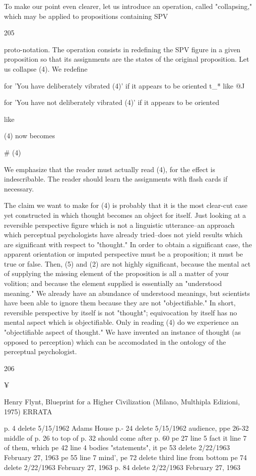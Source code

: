 \documentclass[10pt,twoside]{memoir}
\begin{document}
\begin{enumerate}
{\begin{enumerate}
\begin{sysrules}
\begin{sysrules}
\begin{sysrules}
\begin{sysrules}
{\begin{enumerate}
{{{{{{{{{{{To make our point even clearer, let us introduce an operation, called 
"collapsing," which may be applied to propositions containing SPV 


205 


proto-notation. The operation consists in redefining the SPV figure in a given 
proposition so that its assignments are the states of the original proposition. 
Let us collapse (4). We redefine 

for 'You have deliberately vibrated (4)' if it appears to be oriented 
t_* like @J 

for 'You have not deliberately vibrated (4)' if it appears to be oriented 

like 


(4) now becomes 


# (4) 


We emphasize that the reader must actually read (4), for the effect is 
indescribable. The reader should learn the assignments with flash cards if 
necessary. 

The claim we want to make for (4) is probably that it is the most 
clear-cut case yet constructed in which thought becomes an object for itself. 
Just looking at a reversible perspective figure which is not a linguistic 
utterance--an approach which perceptual psychologists have already 
tried--does not yield results which are significant with respect to "thought." 
In order to obtain a significant case, the apparent orientation or imputed 
perspective must be a proposition; it must be true or false. Then, (5) and (2) 
are not highly significant, because the mental act of supplying the missing 
element of the proposition is all a matter of your volition; and because the 
element supplied is essentially an "understood meaning." We already have an 
abundance of understood meanings, but scientists have been able to ignore 
them because they are not "objectifiable." In short, reversible perspective by 
itself is not "thought"; equivocation by itself has no mental aspect which is 
objectifiable. Only in reading (4) do we experience an "objectifiable aspect 
of thought." We have invented an instance of thought (as opposed to 
perception) which can be accomodated in the ontology of the perceptual 
psychologist. 


206 


¥ 


Henry Flynt, Blueprint for a Higher Civilization 
(Milano, Multhipla Edizioni, 1975) 
ERRATA 


p. 4 delete 5/15/1962 
Adams House 
p.- 24 delete 5/15/1962 
audience, 
ppe 26-32 middle of p. 26 to top of p. 32 
should come after p. 60 
pe 27 line 5 fact it 
line 7 of them, which 
pe 42 line 4 bodies 
"statements", it 
pe 53 delete 2/22/1963 
February 27, 1963 
pe 55 line 7 mind', 
pe 72 delete third line from bottom 
pe 74 delete 2/22/1963 
February 27, 1963 
p. 84 delete 2/22/1963 
February 27, 1963 


}}}}}}}}}}}
\end{enumerate}}
\end{sysrules}
\end{sysrules}
\end{sysrules}
\end{sysrules}
\end{enumerate}}
\end{enumerate}
\end{document}
